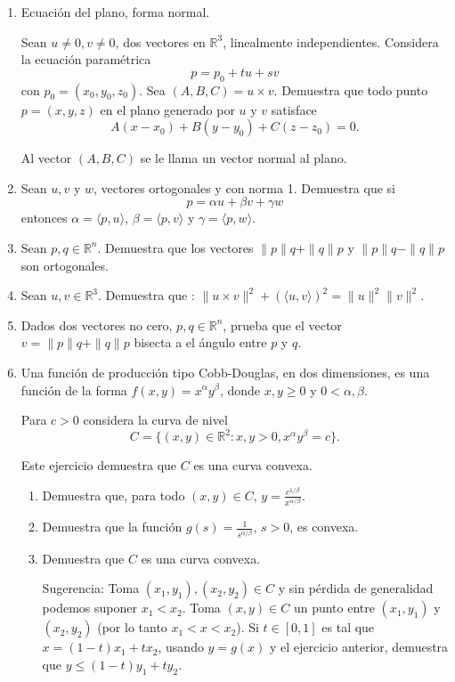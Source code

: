 \documentclass{article}
\theoremstyle{definition}
\begin{document}
  \begin{enumerate}

\item Ecuaci\'on del plano, forma normal. 

Sean $u\ne 0, v\ne 0$, dos vectores en $\mathbb{R}^3$, linealmente independientes. Considera la ecuaci\'on 
param\'etrica
$$
p=p_0+tu+sv
$$	
con $p_0=(x_0,y_0,z_0)$. Sea $(A,B,C)=u\times v$. Demuestra que todo punto $p=(x,y,z)$ en el plano
generado por $u$ y $v$ satisface
$$
A(x-x_0)+B(y-y_0)+C(z-z_0)=0.
$$

Al vector $(A,B,C)$ se le llama un  vector normal al plano.


\item Sean $u,v$ y $w$, vectores ortogonales y con norma 1. Demuestra que si
  $$
  p=\alpha u + \beta v + \gamma w
  $$
  entonces $\alpha = \langle p, u \rangle$, $\beta=\langle p, v \rangle$ y $\gamma= \langle p, w \rangle$.
  
    \item Sean $p,q\in \mathbb{R}^n$. Demuestra que los vectores $\|p\|q+\|q\|p$ y $\|p\|q-\|q\|p$ son ortogonales.
 

      \item Sean $u,v\in \mathbb{R}^3$. Demuestra que : $\|u\times v \|^2+ (\langle u,v \rangle)^2=\|u\|^2\|v\|^2$.

    \item Dados dos vectores no cero, $p,q\in \mathbb{R}^n$, prueba que el vector $v=\|p\|q+\|q\|p$ bisecta a el
    \'angulo entre $p$ y $q$.
    
	
	\item Una funci\'on de producci\'on tipo Cobb-Douglas, en dos dimensiones, es una funci\'on
	de la forma $f(x,y)=x^\alpha y^\beta$, donde $x,y \geq 0$ y $0<\alpha, \beta$.
	
	Para $c>0$ considera la curva de nivel
	$$
	C=\{ (x,y)\in \mathbb{R}^2: x, y > 0, x^\alpha y^\beta =c\}.
	$$
	
	
	
	
	Este ejercicio demuestra que $C$ es una curva convexa. 
	\begin{enumerate}
	\item Demuestra que, para todo $(x,y)\in C$, $y=\frac{c^{1/\beta}}{x^{\alpha/\beta}}$.
	\item Demuestra que la funci\'on $g(s)=\frac{1}{s^{\alpha / \beta}}$, $s >0$, es convexa. 
	\item Demuestra  que $C$ es una curva convexa.
	
	Sugerencia: Toma $(x_1,y_1), (x_2,y_2)\in C$ y sin p\'erdida de generalidad podemos suponer $x_1<x_2$. Toma
	$(x,y)\in C$ un punto entre $(x_1,y_1)$ y $(x_2,y_2)$ (por lo tanto $x_1<x<x_2$). Si $t\in [0,1]$
	es tal que $x=(1-t)x_1+tx_2$, usando $y=g(x)$ y el ejercicio anterior, demuestra que  $y\leq (1-t)y_1+ty_2$.
	

\end{enumerate}
\end{enumerate}
\end{document}
